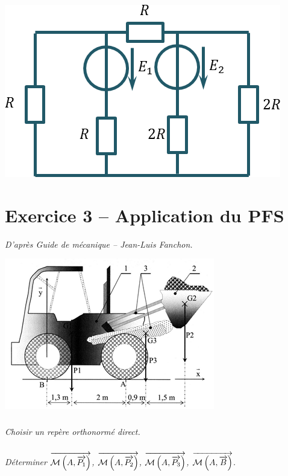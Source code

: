 \documentclass[10pt,fleqn]{book} %
\begin{document}
\begin{multicols}{2}
\begin{center}
\includegraphics[width=\linewidth]{images/fig_04}
\end{center}

\section*{Exercice 3 -- Application du PFS}
\setcounter{subparagraph}{0}

\textit{D'après Guide de mécanique -- Jean-Luis Fanchon.}

\begin{center}
\includegraphics[width=\linewidth]{images/fig_05}
\end{center}

\subparagraph{}
\textit{Choisir un repère orthonormé direct.}


\subparagraph{}
\textit{Déterminer $\overrightarrow{\mathcal{M}\left(A,\overrightarrow{P_1} \right)}$, $\overrightarrow{\mathcal{M}\left(A,\overrightarrow{P_2} \right)}$, 
$\overrightarrow{\mathcal{M}\left(A,\overrightarrow{P_3} \right)}$, $\overrightarrow{\mathcal{M}\left(A,\overrightarrow{B} \right)}$.}



\end{multicols}
\end{document}
